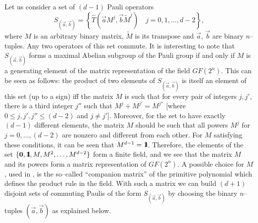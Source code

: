 \documentclass[aps,twocolumn,showpacs,nofootinbib,superscriptaddress]{revtex4}
\begin{document}
Let us consider a set of $(d-1)$ Pauli operators
\begin{equation}
S_{(\vec a,\vec b)}=\left\{ \hat{T}(\vec {a} M^j, \vec {b} \widetilde {M}^j)
\quad j = 0, 1, \ldots, d-2\right\} ,
\label{eqsetPaulis}
\end{equation}
where $M$ is an arbitrary binary matrix, $\widetilde {M}$ is its
transpose and $\vec a$, $\vec b$ are binary $n$--tuples. Any two
operators of this set commute. It is interesting to note that
$S_{(\vec a,\vec b)}$ forms a maximal Abelian subgroup of the
Pauli group if and only if $M$ is a generating element of the
matrix representation of the field $GF(2^n)$. This can be seen as
follows: the product of two elements of $S_{(\vec a,\vec b)}$ is
itself an element of this set (up to a sign) iff the matrix $M$ is
such that for every pair of integers $j,j'$, there is a third
integer $j''$ such that $M^j+M^{j'}=M^{j''}$ [where $0 \le j, j',
j'' \le (d-2)$ and $j \neq j'$]. Moreover, for the set to have
exactly $(d-1)$ different elements, the matrix $M$ should be such
that all powers $M^j$ for $j=0,\ldots,(d-2)$ are nonzero and
different from each other. For $M$ satisfying these conditions, it
can be seen that $M^{d-1}=\mbox{$1 \hspace{-1.0mm}  {\bf l}$}$.
Therefore, the elements of the set $\{{\bf 0}, \mbox{$1
\hspace{-1.0mm} {\bf l}$}, M, M^2,\ldots, M^{d-2}\}$ form a finite
field, and we see that the matrix $M$ and its powers form a matrix
representation of $GF(2^n)$. A possible choice for $M$, used in
\cite{PazRS04b}, is the so--called ``companion matrix'' of the
primitive polynomial which defines the product rule in the field.
With such a matrix we can build $(d+1)$ disjoint sets of commuting
Paulis of the form $S_{(\vec a,\vec b)}$ by choosing the binary
$n$--tuples $(\vec a,\vec{b})$ as explained below.
\end{document}
